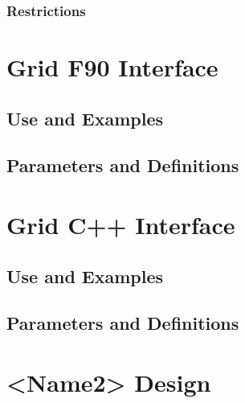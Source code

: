 \documentclass[]{article}
\begin{document}
\subsubsection{Restrictions}




\section{Grid F90 Interface}

\subsection{Use and Examples}




\subsection{Parameters and Definitions}








\section{Grid C++ Interface}

\subsection{Use and Examples}




\subsection{Parameters and Definitions}




% 
% 

\section{<Name2> Design}
\end{document}
